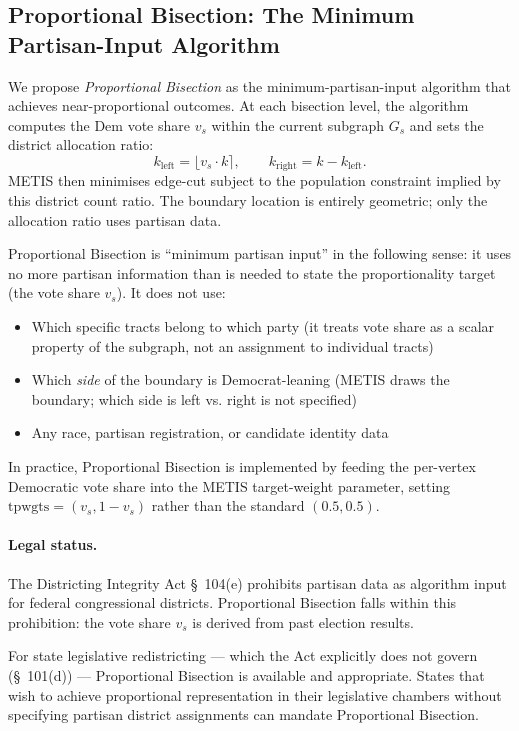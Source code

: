 \subsection{Proportional Bisection: The Minimum Partisan-Input Algorithm}

We propose \emph{Proportional Bisection} as the minimum-partisan-input
algorithm that achieves near-proportional outcomes. At each bisection level,
the algorithm computes the Dem vote share $v_s$ within the current subgraph
$G_s$ and sets the district allocation ratio:
\[
  k_{\mathrm{left}} = \lfloor v_s \cdot k \rceil, \qquad
  k_{\mathrm{right}} = k - k_{\mathrm{left}}.
\]
METIS then minimises edge-cut subject to the population constraint implied by
this district count ratio. The boundary location is entirely geometric; only
the allocation ratio uses partisan data.

Proportional Bisection is ``minimum partisan input'' in the following sense:
it uses no more partisan information than is needed to state the proportionality
target (the vote share $v_s$). It does not use:
\begin{itemize}
  \item Which specific tracts belong to which party (it treats vote share as a
        scalar property of the subgraph, not an assignment to individual tracts)
  \item Which \emph{side} of the boundary is Democrat-leaning (METIS draws the
        boundary; which side is left vs. right is not specified)
  \item Any race, partisan registration, or candidate identity data
\end{itemize}

In practice, Proportional Bisection is implemented by feeding the per-vertex
Democratic vote share into the METIS target-weight parameter, setting
$\mathrm{tpwgts} = (v_s, 1-v_s)$ rather than the standard $(0.5, 0.5)$.

\paragraph{Legal status.}
The Districting Integrity Act \S~104(e) prohibits partisan data as algorithm
input for federal congressional districts. Proportional Bisection falls within
this prohibition: the vote share $v_s$ is derived from past election results.

For state legislative redistricting --- which the Act explicitly does not
govern (\S~101(d)) --- Proportional Bisection is available and appropriate.
States that wish to achieve proportional representation in their legislative
chambers without specifying partisan district assignments can mandate
Proportional Bisection.

